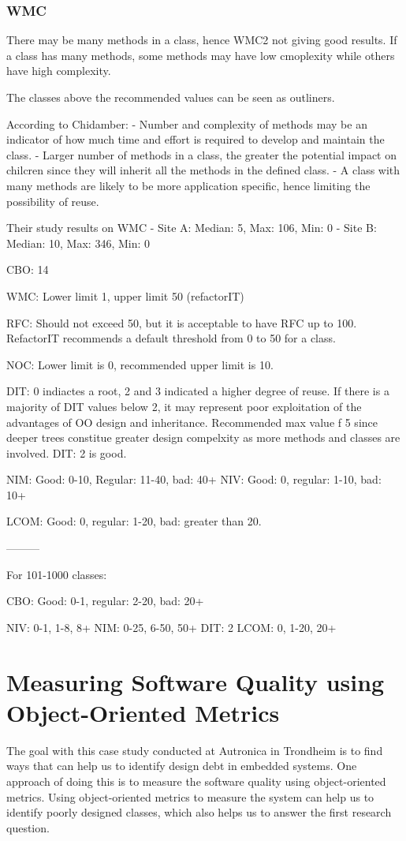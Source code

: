 \subsubsection{WMC}
There may be many methods in a class, hence WMC2 not giving good results. If a class has many methods, some methods may have low cmoplexity while others have high complexity.



The classes above the recommended values can be seen as outliners. 

According to Chidamber: 
- Number and complexity of methods may be an indicator of how much time and effort is required to develop and maintain the class.
- Larger number of methods in a class, the greater the potential impact on chilcren since they will inherit all the methods in the defined class.
- A class with many methods are likely to be more application specific, hence limiting the possibility of reuse.

Their study results on WMC
- Site A: Median: 5, Max: 106, Min: 0
- Site B: Median: 10, Max: 346, Min: 0




CBO: 14

WMC: Lower limit 1, upper limit 50 (refactorIT)

RFC: Should not exceed 50, but it is acceptable to have RFC up to 100. RefactorIT recommends a default threshold from 0 to 50 for a class. 

NOC: Lower limit is 0, recommended upper limit is 10.

DIT: 0 indiactes a root, 2 and 3 indicated a higher degree of reuse. If there is a majority of DIT values 
below 2, it may represent poor exploitation of the advantages of OO design and inheritance. Recommended max value f 5 since deeper trees constitue greater design compelxity as more methods and classes are involved. DIT: 2 is good. 

NIM: Good: 0-10, Regular: 11-40, bad: 40+
NIV: Good: 0, regular: 1-10, bad: 10+

LCOM: Good: 0, regular: 1-20, bad: greater than 20. 

---------

For 101-1000 classes:

CBO: Good: 0-1, regular: 2-20, bad: 20+

NIV: 0-1, 1-8, 8+
NIM: 0-25, 6-50, 50+
DIT: 2
LCOM: 0, 1-20, 20+





\section{Measuring Software Quality using Object-Oriented Metrics}
The goal with this case study conducted at Autronica in Trondheim is to find ways that can help us to identify design debt in embedded systems. One approach of doing this is to measure the software quality using object-oriented metrics. Using object-oriented metrics to measure the system can help us to identify poorly designed classes, which also helps us to answer the first research question.

